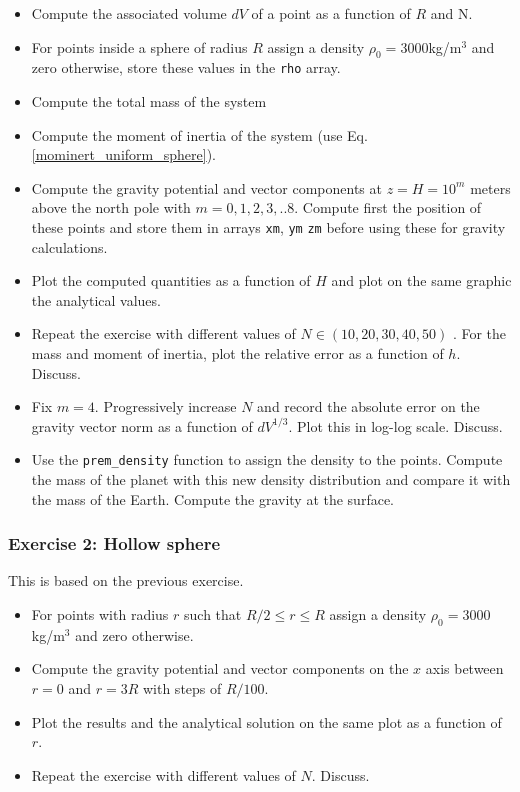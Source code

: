 \begin{itemize}
\item Compute the associated volume $dV$ of a point as a function of $R$ and N.
\item For points inside a sphere of radius $R$ assign a density $\rho_0=3000$kg/m$^3$ and zero otherwise, store these values in the {\tt rho} array.
\item Compute the total mass of the system 
\item Compute the moment of inertia of the system (use Eq. \ref{mominert_uniform_sphere}).
\item Compute the gravity potential and vector components at $z=H=10^m$ meters above the north pole 
with $m=0,1,2,3,..8$. Compute first the position of these points and store them 
in arrays {\tt xm}, {\tt ym} {\tt zm} before using these for gravity calculations. 
\item Plot the computed quantities as a function of $H$ and plot on the same graphic the analytical values. 
\item Repeat the exercise with different values of $N\in(10,20,30,40,50)$ .
For the mass and moment of inertia, plot the relative error as a function of $h$.
Discuss.
\item Fix $m=4$. Progressively increase $N$ and record the absolute error on the gravity vector norm 
as a function of $dV^{1/3}$. Plot this in log-log scale. Discuss.
\item Use the {\tt prem\_density} function to assign the density to the points. Compute the mass of the planet with this new density distribution and compare it with the mass of the Earth. Compute the gravity at the surface.
\end{itemize}

\subsubsection*{Exercise 2: Hollow sphere}

This is based on the previous exercise. 
\begin{itemize}
\item For points with radius $r$ such that $R/2 \le r \le R$ assign a density $\rho_0=3000$kg/m$^3$ 
and zero otherwise.
\item Compute the gravity potential and vector components on the $x$ axis between $r=0$ and $r=3R$ 
with steps of $R/100$.
\item Plot the results and the analytical solution on the same plot as a function of $r$.
\item Repeat the exercise with different values of $N$. Discuss.
\end{itemize}

